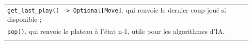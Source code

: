 \documentclass[a4paper,12pt]{article}
\begin{document}
\begin{tabularx}{\textwidth}{|X|}
    \texttt{get\_last\_play() -> Optional[Move]}, qui renvoie le dernier coup joué si disponible ;                                                                                                                                                                                                                                                                                           \\
    \texttt{pop()}, qui renvoie le plateau à l’état n-1, utile pour les algorithmes d’IA.                                                                                                                                                                                                                                                                                                    \\                                                                                                                                                                                                                                                                                                                                   \\
    \hline
\end{tabularx}

\vspace{1cm}
\end{document}
